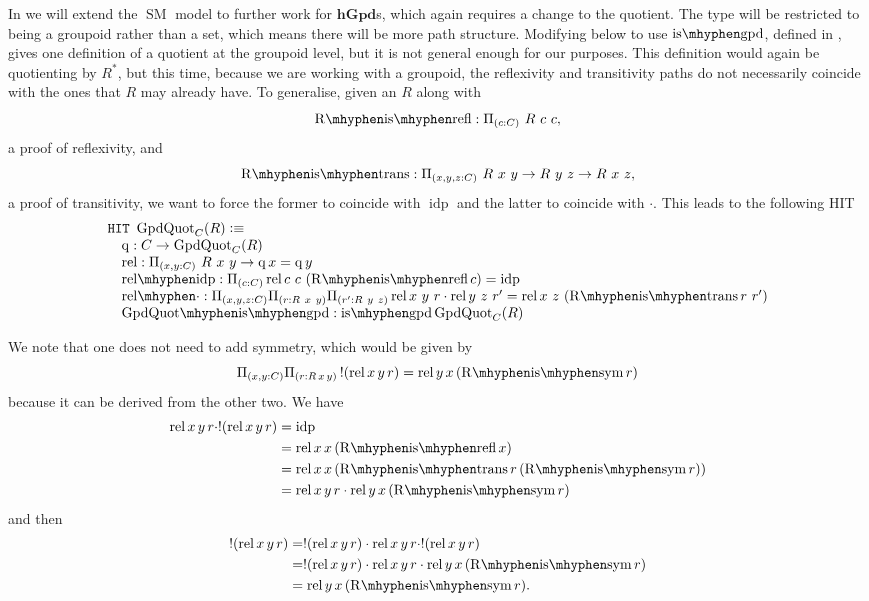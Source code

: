 \documentclass[12pt, parskip, DIV=14]{scrbook}
\newcommand{\defeq}{\vcentcolon\equiv}
\newcommand{\SM}{\operatorname{SM}}
\newcommand{\idp}{\operatorname{idp}}
\newcommand{\isgpd}{\operatorname{is\mhyphen gpd}}
\newcommand{\hGpd}{\mathbf{hGpd}}
\newcommand{\q}{\operatorname{q}}
\newcommand{\rel}{\operatorname{rel}}
\newcommand{\relidp}{\operatorname{rel\mhyphen idp}}
\newcommand{\reldot}{\operatorname{rel\mhyphen \cdot}}
\newcommand{\GpdQuot}{\operatorname{GpdQuot}_C(R)}
\newcommand{\Rrefl}{\operatorname{R\mhyphen is\mhyphen refl}}
\newcommand{\Rsym}{\operatorname{R\mhyphen is\mhyphen sym}}
\newcommand{\Rtrans}{\operatorname{R\mhyphen is\mhyphen trans}}
\begin{document}
In  we will extend the $\SM$ model to further work for $\hGpd$s, which again requires a change to the quotient. The type will be restricted to being a groupoid rather than a set, which means there will be more path structure. Modifying  below to use $\isgpd$, defined in , gives one definition of a quotient at the groupoid level, but it is not general enough for our purposes. This definition would again be quotienting by $R^*$, but this time, because we are working with a groupoid, the reflexivity and transitivity paths do not necessarily coincide with the ones that $R$ may already have. To generalise, given an $R$ along with $$\Rrefl : \Pi_{(c : C)}~R~c~c,$$ a proof of reflexivity, and $$\Rtrans : \Pi_{(x , y , z : C)}~R~x~y \to R~y~z \to R~x~z,$$ a proof of transitivity, we want to force the former to coincide with $\idp$ and the latter to coincide with $\cdot$. This leads to the following HIT
\begin{equation}
\label{eqn:setquot}
\begin{array}{l}
  \mathtt{HIT}~\GpdQuot \defeq \\
  \quad \q : C \to \GpdQuot \\
  \quad \rel : \Pi_{(x,y : C)}~R~x~y \to \q x = \q y \\
  \quad \relidp : \Pi_{(c : C)} \rel c~c~(\Rrefl c) = \idp \\
  \quad \reldot : \Pi_{(x , y, z : C)}\Pi_{(r : R~x~y)}\Pi_{(r' : R~y~z)} \rel x~y~r \cdot \rel y~z~r' = \rel x~z~(\Rtrans r~r') \\
  \quad \mathrm{GpdQuot\mhyphen is\mhyphen gpd} : \isgpd \GpdQuot
\end{array}
\end{equation}

We note that one does not need to add symmetry, which would be given by
$$\Pi_{(x,y : C)}\Pi_{(r : R\,x\,y)}\,! (\rel x\,y\,r) = \rel y\,x\,(\Rsym r)$$
because it can be derived from the other two. We have
\begin{align*}
  \rel x\,y\,r \cdot ! (\rel x\,y\,r) &= \idp \\
  &= \rel x\,x\,(\Rrefl x) \\
  &= \rel x\,x\,(\Rtrans r\,(\Rsym r)) \\
  &= \rel x\,y\,r \cdot \rel y\,x\,(\Rsym r)
\end{align*}
and then
\begin{align*}
  ! (\rel x\,y\,r) &= ! (\rel x\,y\,r) \cdot \rel x\,y\,r \cdot ! (\rel x\,y\,r) \\
  &= ! (\rel x\,y\,r) \cdot \rel x\,y\,r \cdot \rel y\,x\,(\Rsym r) \\
  &= \rel y\,x\,(\Rsym r).
\end{align*}
\end{document}
